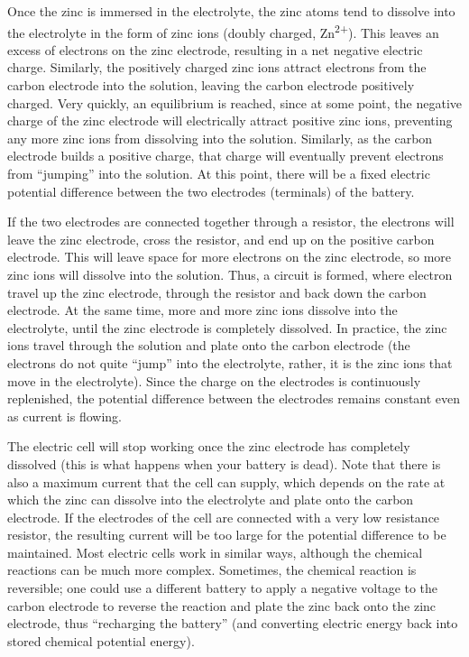 
Once the zinc is immersed in the electrolyte, the zinc atoms tend to dissolve into the electrolyte in the form of zinc ions (doubly charged, Zn\textsuperscript{2+}). This leaves an excess of electrons on the zinc electrode, resulting in a net negative electric charge. Similarly, the positively charged zinc ions attract electrons from the carbon electrode into the solution, leaving the carbon electrode positively charged. Very quickly, an equilibrium is reached, since at some point, the negative charge of the zinc electrode will electrically attract positive zinc ions, preventing any more zinc ions from dissolving into the solution. Similarly, as the carbon electrode builds a positive charge, that charge will eventually prevent electrons from ``jumping'' into the solution. At this point, there will be a fixed electric potential difference between the two electrodes (terminals) of the battery.

If the two electrodes are connected together through a resistor, the electrons will leave the zinc electrode, cross the resistor, and end up on the positive carbon electrode. This will leave space for more electrons on the zinc electrode, so more zinc ions will dissolve into the solution. Thus, a circuit is formed, where electron travel up the zinc electrode, through the resistor and back down the carbon electrode. At the same time, more and more zinc ions dissolve into the electrolyte, until the zinc electrode is completely dissolved. In practice, the zinc ions travel through the solution and plate onto the carbon electrode (the electrons do not quite ``jump'' into the electrolyte, rather, it is the zinc ions that move in the electrolyte). Since the charge on the electrodes is continuously replenished, the potential difference between the electrodes remains constant even as current is flowing.

The electric cell will stop working once the zinc electrode has completely dissolved (this is what happens when your battery is dead). Note that there is also a maximum current that the cell can supply, which depends on the rate at which the zinc can dissolve into the electrolyte and plate onto the carbon electrode. If the electrodes of the cell are connected with a very low resistance resistor, the resulting current will be too large for the potential difference to be maintained. Most electric cells work in similar ways, although the chemical reactions can be much more complex. Sometimes, the chemical reaction is reversible; one could use a different battery to apply a negative voltage to the carbon electrode to reverse the reaction and plate the zinc back onto the zinc electrode, thus ``recharging the battery'' (and converting electric energy back into stored chemical potential energy).

